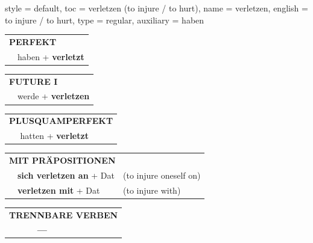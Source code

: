 \begin{verbentry}{
  style = {default},
  toc = {verletzen (to injure / to hurt)},
  name = {verletzen},
  english = {to injure / to hurt},
  type = {regular},
  auxiliary = {haben}
}
 \begin{tabular}{rl}
     \multicolumn{2}{l}{\textbf{PERFEKT}}\\
   & haben + \textbf{verletzt}\\
  \end{tabular}
\hfill
   \begin{tabular}{rl}
    \multicolumn{2}{l}{\textbf{FUTURE I} }\\
   & werde + \textbf{verletzen}\\
  \end{tabular}
\hfill
   \begin{tabular}{rl}
      \multicolumn{2}{l}{\textbf{PLUSQUAMPERFEKT}}\\
   & hatten + \textbf{verletzt}\\
  \end{tabular}

   \vspace{10pt}

   \begin{tabular}{lll}
      \multicolumn{3}{l}{\textbf{MIT PRÄPOSITIONEN}}\\
& \textbf{sich verletzen an} + Dat & (to injure oneself on)\\
& \textbf{verletzen mit} + Dat & (to injure with)\\
\end{tabular}
  \hfill
   \begin{tabular}{lll}
\multicolumn{3}{l}{\textbf{TRENNBARE VERBEN}}\\
& \textbf{---} & \\
\end{tabular}

  \vspace{-5pt}
\end{verbentry}

